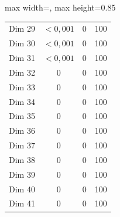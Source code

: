 \begin{table}[H]
\begin{adjustbox}{max width=\textwidth, max height=0.85\textheight}
\begin{tabular}{|c|c|c|c|}
Dim 29 & $< 0,001$ & 0 & 100 \\
Dim 30 & $< 0,001$ & 0 & 100 \\
Dim 31 & $< 0,001$ & 0 & 100 \\
Dim 32 & 0 & 0 & 100 \\
Dim 33 & 0 & 0 & 100 \\
Dim 34 & 0 & 0 & 100 \\
Dim 35 & 0 & 0 & 100 \\
Dim 36 & 0 & 0 & 100 \\
Dim 37 & 0 & 0 & 100 \\
Dim 38 & 0 & 0 & 100 \\
Dim 39 & 0 & 0 & 100 \\
Dim 40 & 0 & 0 & 100 \\
Dim 41 & 0 & 0 & 100 \\
\hline
\end{tabular}
\end{adjustbox}
\end{table}